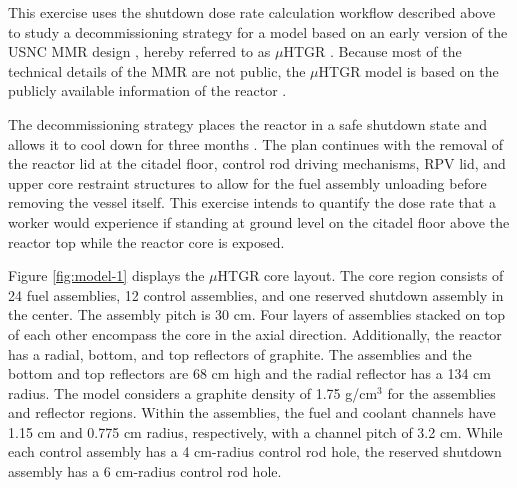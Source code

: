 


This exercise uses the shutdown dose rate calculation workflow described above to study a decommissioning strategy for a model based on an early version of the \gls*{USNC} \gls*{MMR} design \cite{uiuc-mmr2}, hereby referred to as $\mu$HTGR \cite{fairhurst_sdr_2023}.
Because most of the technical details of the MMR are not public, the $\mu$HTGR model is based on the publicly available information of the reactor \cite{uiuc-mmr2, usnc_mmr, chalk_mmr, neup_mmr}.

The decommissioning strategy places the reactor in a safe shutdown state and allows it to cool down for three months \cite{usnc_mmr}.
The plan continues with the removal of the reactor lid at the citadel floor, control rod driving mechanisms, \gls*{RPV} lid, and upper core restraint structures to allow for the fuel assembly unloading before removing the vessel itself.
This exercise intends to quantify the dose rate that a worker would experience if standing at ground level on the citadel floor above the reactor top while the reactor core is exposed.

Figure \ref{fig:model-1} displays the $\mu$HTGR core layout.
The core region consists of 24 fuel assemblies, 12 control assemblies, and one reserved shutdown assembly in the center.
The assembly pitch is 30 cm.
Four layers of assemblies stacked on top of each other encompass the core in the axial direction.
Additionally, the reactor has a radial, bottom, and top reflectors of graphite.
The assemblies and the bottom and top reflectors are 68 cm high and the radial reflector has a 134 cm radius.
The model considers a graphite density of 1.75 g/cm$^3$ for the assemblies and reflector regions.
Within the assemblies, the fuel and coolant channels have 1.15 cm and 0.775 cm radius, respectively, with a channel pitch of 3.2 cm.
While each control assembly has a 4 cm-radius control rod hole, the reserved shutdown assembly has a 6 cm-radius control rod hole.

